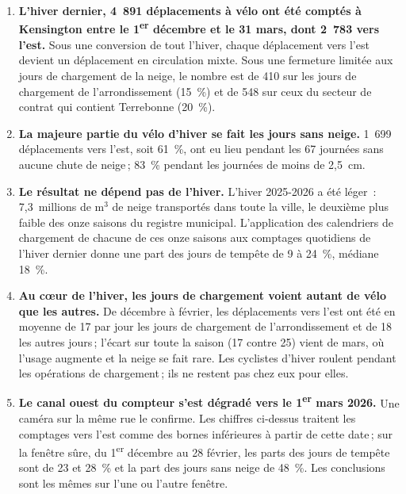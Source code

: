 \documentclass[11pt,letterpaper]{article}
\begin{document}
\begin{enumerate}[nosep]
  \item \begin{minipage}[t]{\linewidth}\textbf{L'hiver dernier, 4~891 déplacements à vélo ont été comptés à
    Kensington entre le 1\textsuperscript{er} décembre et le 31 mars, dont
    2~783 vers l'est.} Sous une conversion de tout l'hiver, chaque
    déplacement vers l'est devient un déplacement en circulation mixte.
    Sous une fermeture limitée aux jours de chargement de la neige, le
    nombre est de 410 sur les jours de chargement de l'arrondissement
    (15~\%) et de 548 sur ceux du secteur de contrat qui contient
    Terrebonne (20~\%).\end{minipage}\vspace{0.35em}
  \item \begin{minipage}[t]{\linewidth}\textbf{La majeure partie du vélo d'hiver se fait les jours sans
    neige.} 1~699 déplacements vers l'est, soit 61~\%, ont eu lieu pendant
    les 67 journées sans aucune chute de neige\,; 83~\% pendant les
    journées de moins de 2,5~cm.\end{minipage}\vspace{0.35em}
  \item \begin{minipage}[t]{\linewidth}\textbf{Le résultat ne dépend pas de l'hiver.} L'hiver 2025-2026 a
    été léger~: 7,3~millions de m$^3$ de neige transportés dans toute la
    ville, le deuxième plus faible des onze saisons du registre municipal.
    L'application des calendriers de chargement de chacune de ces onze
    saisons aux comptages quotidiens de l'hiver dernier donne une part des
    jours de tempête de 9 à 24~\%, médiane 18~\%.\end{minipage}\vspace{0.35em}
  \item \begin{minipage}[t]{\linewidth}\textbf{Au c\oe ur de l'hiver, les jours de chargement voient autant
    de vélo que les autres.} De décembre à février, les déplacements vers
    l'est ont été en moyenne de 17 par jour les jours de chargement de
    l'arrondissement et de 18 les autres jours\,; l'écart sur toute la
    saison (17 contre 25) vient de mars, où l'usage augmente et la neige
    se fait rare. Les cyclistes d'hiver roulent pendant les opérations de
    chargement\,; ils ne restent pas chez eux pour elles.\end{minipage}\vspace{0.35em}
  \item \begin{minipage}[t]{\linewidth}\textbf{Le canal ouest du compteur s'est dégradé vers le
    1\textsuperscript{er} mars 2026.} Une caméra sur la même rue le
    confirme. Les chiffres ci-dessus traitent les comptages vers l'est
    comme des bornes inférieures à partir de cette date\,; sur la fenêtre
    sûre, du 1\textsuperscript{er} décembre au 28 février, les parts des
    jours de tempête sont de 23 et 28~\% et la part des jours sans neige
    de 48~\%. Les conclusions sont les mêmes sur l'une ou l'autre
    fenêtre.\end{minipage}
\end{enumerate}
\end{document}

